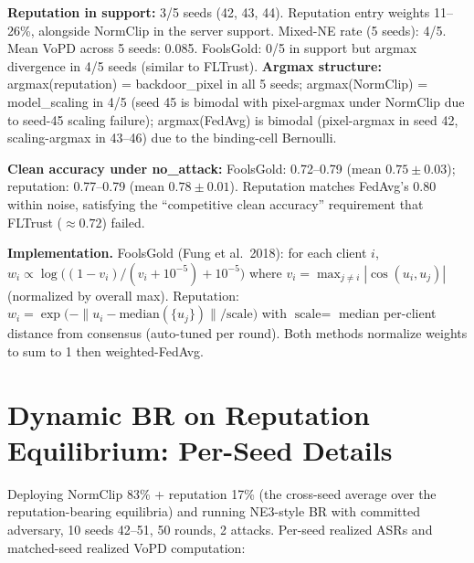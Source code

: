 \documentclass{article}
\begin{document}
\textbf{Reputation in support:} 3/5 seeds (42, 43, 44). Reputation entry weights 11--26\%, alongside NormClip in the server support. Mixed-NE rate (5 seeds): 4/5. Mean VoPD across 5 seeds: 0.085. FoolsGold: 0/5 in support but argmax divergence in 4/5 seeds (similar to FLTrust). \textbf{Argmax structure:} argmax(reputation) = backdoor\_pixel in all 5 seeds; argmax(NormClip) = model\_scaling in 4/5 (seed 45 is bimodal with pixel-argmax under NormClip due to seed-45 scaling failure); argmax(FedAvg) is bimodal (pixel-argmax in seed 42, scaling-argmax in 43--46) due to the binding-cell Bernoulli.

\textbf{Clean accuracy under no\_attack:} FoolsGold: 0.72--0.79 (mean $0.75 \pm 0.03$); reputation: 0.77--0.79 (mean $0.78 \pm 0.01$). Reputation matches FedAvg's 0.80 within noise, satisfying the ``competitive clean accuracy'' requirement that FLTrust ($\approx 0.72$) failed.

\textbf{Implementation.} FoolsGold (Fung et al.\ 2018): for each client $i$, $w_i \propto \log\!\bigl((1 - v_i)/(v_i + 10^{-5}) + 10^{-5}\bigr)$ where $v_i = \max_{j \neq i} |\cos(u_i, u_j)|$ (normalized by overall max). Reputation: $w_i = \exp\!\bigl(-\|u_i - \mathrm{median}(\{u_j\})\|/\text{scale}\bigr)$ with $\text{scale} = $ median per-client distance from consensus (auto-tuned per round). Both methods normalize weights to sum to 1 then weighted-FedAvg.

\section{Dynamic BR on Reputation Equilibrium: Per-Seed Details}
\label{app:reputation_br_details}

Deploying NormClip 83\% + reputation 17\% (the cross-seed average over the reputation-bearing equilibria) and running NE3-style BR with committed adversary, 10 seeds 42--51, 50 rounds, 2 attacks. Per-seed realized ASRs and matched-seed realized VoPD computation:
\end{document}
